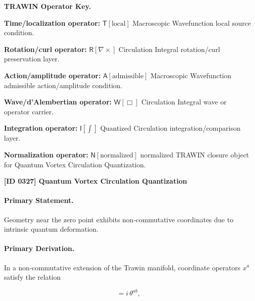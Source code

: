 \par\vspace{0.45\baselineskip}
\noindent\begin{minipage}[t]{\linewidth}
\begingroup
\small
\raggedright
\textbf{TRAWIN Operator Key.}\par
\noindent\textbf{Time/localization operator:} $\mathsf{T}\!\left[\mathrm{local}\right]$ Macroscopic Wavefunction local source condition.\par
\noindent\textbf{Rotation/curl operator:} $\mathsf{R}\!\left[\nabla\times\right]$ Circulation Integral rotation/curl preservation layer.\par
\noindent\textbf{Action/amplitude operator:} $\mathsf{A}\!\left[\mathrm{admissible}\right]$ Macroscopic Wavefunction admissible action/amplitude condition.\par
\noindent\textbf{Wave/d'Alembertian operator:} $\mathsf{W}\!\left[\Box\right]$ Circulation Integral wave or operator carrier.\par
\noindent\textbf{Integration operator:} $\mathsf{I}\!\left[\int\right]$ Quantized Circulation integration/comparison layer.\par
\noindent\textbf{Normalization operator:} $\mathsf{N}\!\left[\mathrm{normalized}\right]$ normalized TRAWIN closure object for Quantum Vortex Circulation Quantization.\par
\endgroup
\end{minipage}

\clearpage
\noindent\textbf{[ID 0327] Quantum Vortex Circulation Quantization}\par
\vspace{0.35em}
\paragraph{Primary Statement.}

Geometry near the zero point exhibits non‑commutative coordinates due to intrinsic quantum deformation.

\paragraph{Primary Derivation.}

In a non‑commutative extension of the Trawin manifold, coordinate operators $x^a$ satisfy the relation

\begin{equation}
[ x^a , x^b ] = i\,\theta^{ab},
\end{equation}


